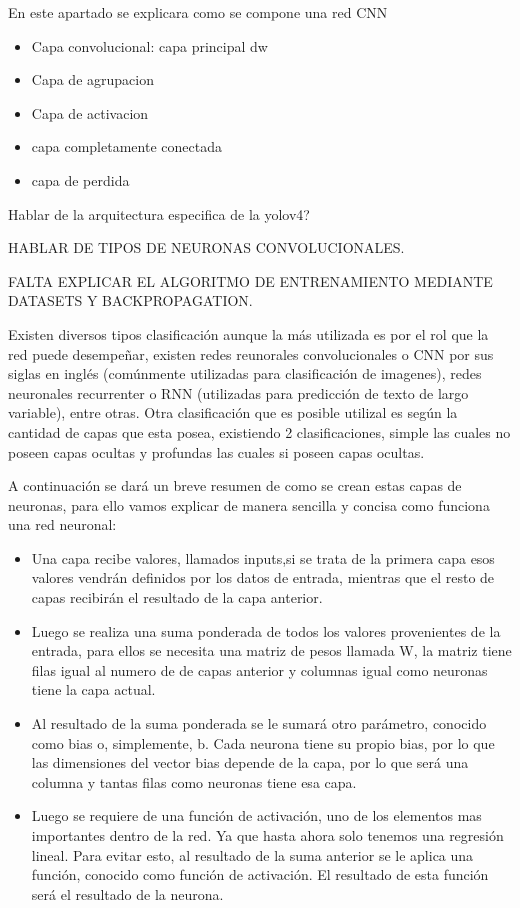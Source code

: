 En este apartado se explicara como se compone una red CNN
\begin{itemize}
\item Capa convolucional: capa principal dw
\item Capa de agrupacion
\item Capa de activacion
\item capa completamente conectada
\item capa de perdida
\end{itemize}

Hablar de la arquitectura especifica de la yolov4?


HABLAR DE TIPOS DE NEURONAS CONVOLUCIONALES.

FALTA EXPLICAR EL ALGORITMO DE ENTRENAMIENTO MEDIANTE DATASETS Y BACKPROPAGATION.

Existen diversos tipos clasificación aunque la más utilizada es por el rol que la red puede desempeñar, existen redes reunorales convolucionales o CNN por sus siglas en inglés (comúnmente utilizadas para clasificación de imagenes),
redes neuronales recurrenter o RNN (utilizadas para predicción de texto de largo variable), entre otras. Otra clasificación que es posible utilizal es según la cantidad de capas que esta posea, existiendo 2 clasificaciones, simple las cuales no poseen capas ocultas y profundas las cuales si poseen capas ocultas.

A continuación se dará un breve resumen de como se crean estas capas de neuronas, para ello vamos explicar de manera sencilla y concisa como funciona una red neuronal:
\begin{itemize}
    \item Una capa recibe valores, llamados inputs,si se trata de la primera capa esos valores vendrán definidos por los datos de entrada, mientras que el resto de capas recibirán el resultado de la capa anterior.
    \item Luego se realiza una suma ponderada de todos los valores provenientes de la entrada, para ellos se necesita una matriz de pesos llamada W, la matriz tiene filas igual al numero de de capas anterior y columnas igual como neuronas tiene la capa actual.
    \item Al resultado de la suma ponderada se le sumará otro parámetro, conocido como bias o, simplemente, b. Cada neurona tiene su propio bias, por lo que las dimensiones del vector bias depende de la capa, por lo que será una columna y tantas filas como neuronas tiene esa capa.
    \item Luego se requiere de una función de activación, uno de los elementos mas importantes dentro de la red. Ya que hasta ahora solo tenemos una regresión lineal. Para evitar esto, al resultado de la suma anterior se le aplica una función, conocido como función de activación. El resultado de esta función será el resultado de la neurona.
\end{itemize}

